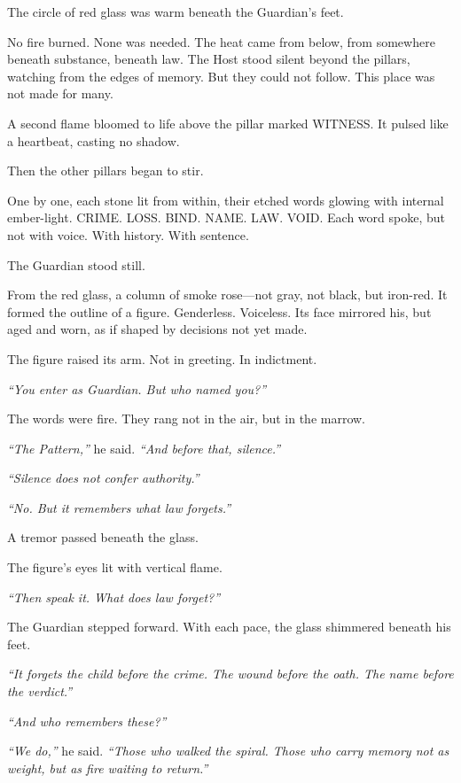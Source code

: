 \documentclass[12pt]{article}
\begin{document}
The circle of red glass was warm beneath the Guardian’s feet.

No fire burned. None was needed. The heat came from below, from somewhere beneath substance, beneath law. The Host stood silent beyond the pillars, watching from the edges of memory. But they could not follow. This place was not made for many.

A second flame bloomed to life above the pillar marked \textsc{WITNESS}. It pulsed like a heartbeat, casting no shadow.

Then the other pillars began to stir.

One by one, each stone lit from within, their etched words glowing with internal ember-light. \textsc{CRIME}. \textsc{LOSS}. \textsc{BIND}. \textsc{NAME}. \textsc{LAW}. \textsc{VOID}. Each word spoke, but not with voice. With history. With sentence.

The Guardian stood still.

From the red glass, a column of smoke rose—not gray, not black, but iron-red. It formed the outline of a figure. Genderless. Voiceless. Its face mirrored his, but aged and worn, as if shaped by decisions not yet made.

The figure raised its arm. Not in greeting. In indictment.

\textit{``You enter as Guardian. But who named you?''}

The words were fire. They rang not in the air, but in the marrow.

\textit{``The Pattern,''} he said. \textit{``And before that, silence.''}

\textit{``Silence does not confer authority.''}

\textit{``No. But it remembers what law forgets.''}

A tremor passed beneath the glass.

The figure's eyes lit with vertical flame.

\textit{``Then speak it. What does law forget?''}

The Guardian stepped forward. With each pace, the glass shimmered beneath his feet.

\textit{``It forgets the child before the crime. The wound before the oath. The name before the verdict.''}

\textit{``And who remembers these?''}

\textit{``We do,''} he said. \textit{``Those who walked the spiral. Those who carry memory not as weight, but as fire waiting to return.''}
\end{document}
